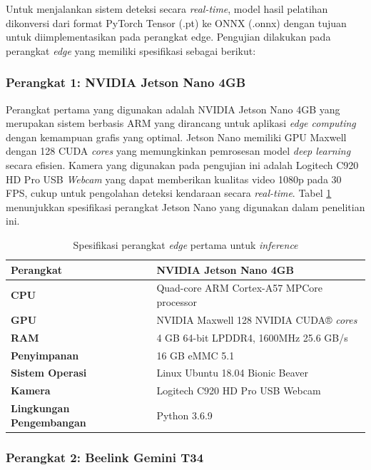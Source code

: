 Untuk menjalankan sistem deteksi secara \emph{real-time}, model hasil pelatihan dikonversi dari format PyTorch Tensor (.pt) ke ONNX (.onnx) dengan tujuan untuk diimplementasikan pada perangkat edge. Pengujian dilakukan pada perangkat \emph{edge} yang memiliki spesifikasi sebagai berikut:

\subsubsection{Perangkat 1: NVIDIA Jetson Nano 4GB}

Perangkat pertama yang digunakan adalah NVIDIA Jetson Nano 4GB yang merupakan sistem berbasis ARM yang dirancang untuk aplikasi \emph{edge computing} dengan kemampuan grafis yang optimal. Jetson Nano memiliki GPU Maxwell dengan 128 CUDA \emph{cores} yang memungkinkan pemrosesan model \emph{deep learning} secara efisien. Kamera yang digunakan pada pengujian ini adalah Logitech C920 HD Pro USB \emph{Webcam} yang dapat memberikan kualitas video 1080p pada 30 FPS, cukup untuk pengolahan deteksi kendaraan secara \emph{real-time}. Tabel \ref{tab:jetson_nano_specs} menunjukkan spesifikasi perangkat Jetson Nano yang digunakan dalam penelitian ini.

\begin{table}[htbp]
  \centering
  \caption{Spesifikasi perangkat \emph{edge} pertama untuk \emph{inference}}
  \label{tab:jetson_nano_specs}
  \begin{tabular}{|l|l|}
  \hline
  \textbf{Perangkat} & NVIDIA Jetson Nano 4GB \\
  \hline
  \textbf{CPU} & Quad-core ARM Cortex-A57 MPCore processor \\
  \hline
  \textbf{GPU} & NVIDIA Maxwell 128 NVIDIA CUDA® \emph{cores} \\
  \hline
  \textbf{RAM} & 4 GB 64-bit LPDDR4, 1600MHz 25.6 GB/s \\
  \hline
  \textbf{Penyimpanan} & 16 GB eMMC 5.1 \\
  \hline
  \textbf{Sistem Operasi} & Linux Ubuntu 18.04 Bionic Beaver \\
  \hline
  \textbf{Kamera} & Logitech C920 HD Pro USB Webcam \\
  \hline
  \textbf{Lingkungan Pengembangan} & Python 3.6.9 \\
  \hline
  \end{tabular}
\end{table}

\subsubsection{Perangkat 2: Beelink Gemini T34}

